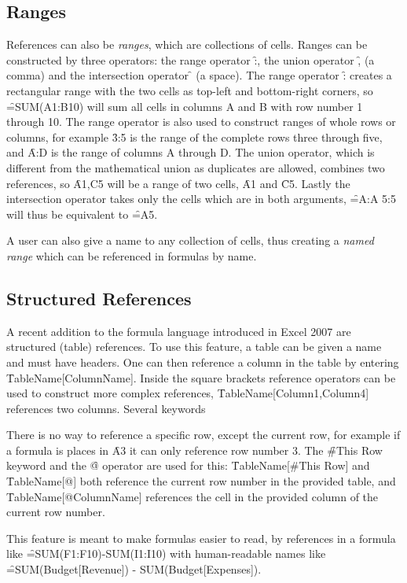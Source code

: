 \subsection{Ranges}
References can also be \emph{ranges}, which are collections of cells.
Ranges can be constructed by three operators: the range operator \f{:}, the union operator \f{,} (a comma) and the intersection operator \f{} (a space).
The range operator \f{:} creates a rectangular range with the two cells as top-left and bottom-right corners, so \f{=SUM(A1:B10)} will sum all cells in columns A and B with row number 1 through 10.
The range operator is also used to construct ranges of whole rows or columns, for example \f{3:5} is the range of the complete rows three through five, and \f{A:D} is the range of columns A through D.
The union operator, which is different from the mathematical union as duplicates are allowed, combines two references, so \f{A1,C5} will be a range of two cells, \f{A1} and \f{C5}.
Lastly the intersection operator takes only the cells which are in both arguments, \f{=A:A 5:5} will thus be equivalent to \f{=A5}.

A user can also give a name to any collection of cells, thus creating a \emph{named range} which can be referenced in formulas by name.

\subsection{Structured References}

A recent addition to the formula language introduced in Excel 2007 are structured (table) references.
To use this feature, a table can be given a name and must have headers.
One can then reference a column in the table by entering \f{TableName[ColumnName]}.
Inside the square brackets reference operators can be used to construct more complex references, \f{TableName[Column1,Column4]} references two columns.
Several keywords 

There is no way to reference a specific row, except the current row, for example if a formula is places in \f{A3} it can only reference row number 3.
The \f{\#This Row} keyword and the \f{@} operator are used for this: \f{TableName[\#This Row]} and \f{TableName[@]} both reference the current row number in the provided table, and \f{TableName[@ColumnName]} references the cell in the provided column of the current row number.

This feature is meant to make formulas easier to read, by references in a formula like \f{=SUM(F1:F10)-SUM(I1:I10)} with human-readable names like \f{=SUM(Budget[Revenue]) - SUM(Budget[Expenses])}.

